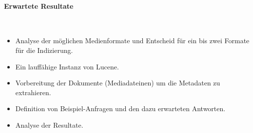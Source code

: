 \paragraph{Erwartete Resultate} \hfill \\
\begin{itemize}
    \item Analyse der möglichen Medienformate und Entscheid für ein bis zwei Formate für die Indizierung.
    \item Ein lauffähige Instanz von Lucene.
    \item Vorbereitung der Dokumente (Mediadateinen) um die Metadaten zu extrahieren.
    \item Definition von Beispiel-Anfragen und den dazu erwarteten Antworten.
    \item Analyse der Resultate.
\end{itemize}

